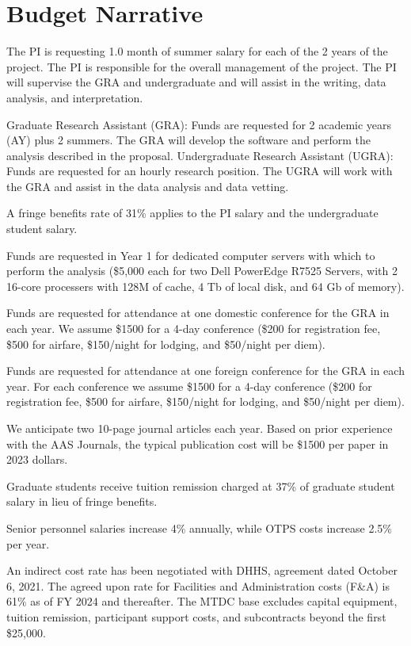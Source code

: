 \documentclass[12pt, preprint]{hacked-aastex}
\begin{document}
\clearpage
\section{Budget Narrative}\label{sec:budget}

 The PI is requesting 1.0 month of
summer salary for each of the 2 years of the project.  The PI is
responsible for the overall management of the project. The PI will
supervise the GRA and undergraduate and will assist in the writing,
data analysis, and interpretation.

 Graduate Research Assistant (GRA):
Funds are requested for 2 academic years (AY) plus 2 summers. The GRA
will develop the software and perform the analysis described in the
proposal. Undergraduate Research Assistant (UGRA): Funds are requested
for an hourly research position. The UGRA will work with the GRA and
assist in the data analysis and data vetting.

 A fringe benefits rate 
of 31\% applies to the PI salary and the undergraduate student salary.

 Funds are requested in Year 1 for 
dedicated computer  servers with which to perform the analysis (\$5,000 each
for two Dell PowerEdge R7525 Servers, with 2 16-core processers with 128M 
of cache, 4 Tb of local disk,  and 64 Gb of memory).

 Funds are requested for attendance at
one domestic conference for the GRA in each year. We assume \$1500 for
a 4-day conference (\$200 for registration fee, \$500 for airfare,
\$150/night for lodging, and \$50/night per diem).

 Funds are requested for attendance at
one foreign conference for the GRA in each year. For each conference
we assume \$1500 for a 4-day conference (\$200 for registration fee,
\$500 for airfare, \$150/night for lodging, and \$50/night per diem).

 We anticipate two 10-page journal
articles each year. Based on prior experience with the AAS Journals,
the typical publication cost will be \$1500 per paper in 2023 dollars.

 Graduate students receive tuition
remission charged at 37\% of graduate student salary in lieu of fringe
benefits.

 Senior personnel salaries increase 4\%
annually, while OTPS costs increase 2.5\% per year.

 An indirect cost rate has been
negotiated with DHHS, agreement dated October 6, 2021.  The agreed
upon rate for Facilities and Administration costs (F\&A) is 61\% as of
FY 2024 and thereafter.  The MTDC base excludes capital equipment,
tuition remission, participant support costs, and subcontracts beyond
the first \$25,000.
\end{document}

